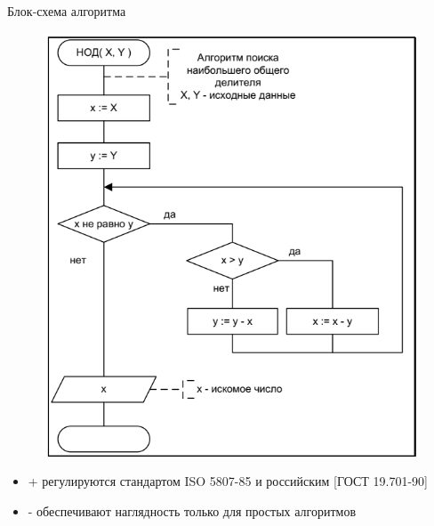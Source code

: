\documentclass{beamer}
\begin{document}
\begin{frame}
\begin{block}{Блок-схема алгоритма}
\begin{figure}[h]
\centering
\includegraphics[scale=0.35]{images/lec01-pic02.png}
\end{figure}
\end{block}
\begin{itemize}
\item + регулируются стандартом ISO 5807-85 и российским [ГОСТ 19.701-90]
\item - обеспечивают наглядность только для простых алгоритмов
\end{itemize}
\end{frame}
\end{document}
